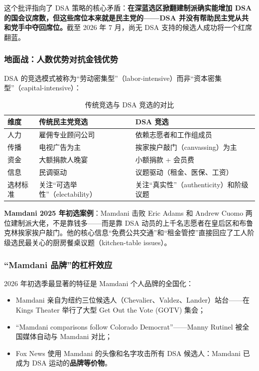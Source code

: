 \documentclass[12pt,a4paper]{ctexart}
\begin{document}
这个批评指向了 DSA 策略的核心矛盾：\textbf{在深蓝选区掀翻建制派确实能增加 DSA 的国会议席数，但这些席位本来就是民主党的——DSA 并没有帮助民主党从共和党手中夺回席位。}截至 2026 年 7 月，尚无 DSA 支持的候选人成功将一个红席翻蓝。

\subsubsection{地面战：人数优势对抗金钱优势}

DSA 的竞选模式被称为``劳动密集型''（labor-intensive）而非``资本密集型''（capital-intensive）：

\begin{table}[h]
\centering
\caption{传统竞选与 DSA 竞选的对比}
\begin{tabular}{@{}lp{6.4cm}p{6.4cm}@{}}
\toprule
\textbf{维度} & \textbf{传统民主党竞选} & \textbf{DSA 竞选} \\
\midrule
人力 & 雇佣专业顾问公司 & 依赖志愿者和工作组成员 \\
传播 & 电视广告为主 & 挨家挨户敲门（canvassing）为主 \\
资金 & 大额捐款人晚宴 & 小额捐款 + 会员费 \\
信息 & 民调驱动 & 议题驱动（租金、医保、工资） \\
选材标准 & 关注``可选举性''（electability） & 关注``真实性''（authenticity）和阶级议题 \\
\bottomrule
\end{tabular}
\end{table}

\textbf{Mamdani 2025 年初选案例}：Mamdani 击败 Eric Adams 和 Andrew Cuomo 两位建制派大佬，不是靠钱多——而是靠 DSA 动员的上千名志愿者在皇后区和布鲁克林挨家挨户敲门。他的核心信息``免费公共交通''和``租金管控''直接回应了工人阶级选民最关心的厨房餐桌议题（kitchen-table issues）。

\subsubsection{``Mamdani 品牌''的杠杆效应}

2026 年初选季最显著的特征是 Mamdani 个人品牌的全国化：

\begin{itemize}
  \item Mamdani 亲自为纽约三位候选人（Chevalier、Valdez、Lander）站台——在 Kings Theater 举行了大型 Get Out the Vote (GOTV) 集会；
  \item ``Mamdani comparisons follow Colorado Democrat''——Manny Rutinel 被全国媒体自动与 Mamdani 对比；
  \item Fox News 使用 Mamdani 的头像和名字攻击所有 DSA 候选人：Mamdani 已成为 DSA 运动的\textbf{品牌等价物}。
\end{itemize}
\end{document}
